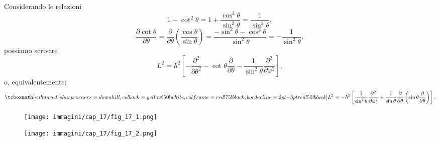 Considerando le relazioni
	\begin{equation}
		1+ \cot ^2 \theta = 1+\frac{\cos ^2 \theta}{\sin ^2 \theta} = \frac{1}{\sin ^2 \theta},
	\end{equation}
	\begin{equation}
		\frac{\partial \cot \theta}{\partial \theta}= \frac{\partial}{\partial \theta}\left( \frac{\cos  \theta}{\sin \theta} \right) = \frac{-\sin ^ 2 \theta - \cos ^2 \theta}{\sin ^2 \theta}=-\frac{1}{\sin ^2 \theta},
	\end{equation}
possiamo scrivere
	\begin{equation}
		L^2 = \hbar ^2 \left[- \frac{\partial ^2}{\partial \theta ^2}-\cot \theta \frac{\partial}{\partial \theta}- \frac{1}{\sin ^2 \theta}\frac{\partial ^2}{\partial \varphi ^2}\right] ,
	\end{equation}
o, equivalentemente:
	\begin{equation}
		\tcboxmath[enhanced, sharp corners=downhill, colback=yellow!50!white, colframe=red!75!black, borderline={2pt}{-3pt}{red!50!black}]{
			L^2 = -\hbar ^2 \left[\frac{1}{\sin ^2 \theta}\frac{\partial ^2}{\partial \varphi ^2}+\frac{1}{\sin \theta}\frac{\partial}{\partial \theta} \left(\sin \theta \frac{\partial}{\partial \theta}\right)\right] .
			}
	\end{equation}
\newpage
\begin{figure}[!htbp]
\begin{center}
\texttt{[image: immagini/cap\_17/fig\_17\_1.png]}\\
\end{center}
\end{figure}
\begin{figure}[!htbp]
\begin{center}
\texttt{[image: immagini/cap\_17/fig\_17\_2.png]}\\
\end{center}
\end{figure}
